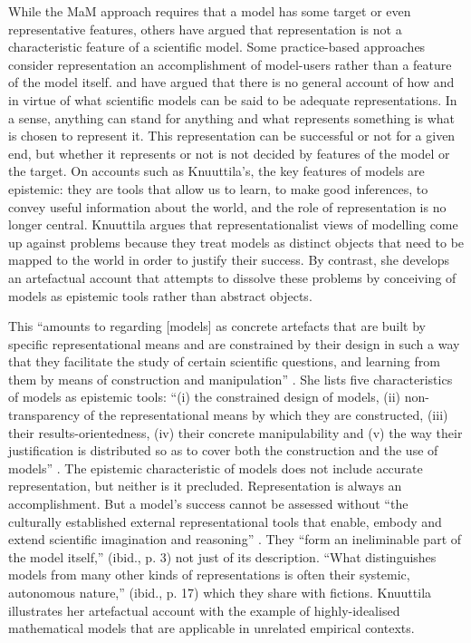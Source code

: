 While the MaM approach requires that a model has some target or even representative features, others have argued  
that representation is not a characteristic feature of a scientific model.
Some practice-based approaches consider representation an accomplishment of model-users rather than a feature of the model itself.
\citet{knuuttila2011,Knuuttila2017} and \citet{teller01} have argued that there is no general account of how and in virtue of what scientific models can be said to be adequate representations. 
In a sense, anything can stand for anything and what represents something is what is chosen to represent it.
This representation can be successful or not for a given end, but whether it represents or not is not decided by features of the model or the target.
On accounts such as Knuuttila's, the key features of models are epistemic: they are tools that allow us to learn, to make good inferences, to convey useful information about the world, and the role of representation is no longer central.
Knuuttila argues that representationalist views of modelling come up against problems because they treat models as distinct objects that need to be mapped to the world in order to justify their success. 
By contrast, she develops an artefactual account that attempts to dissolve these problems by conceiving of models as epistemic tools rather than abstract objects.

This ``amounts to regarding [models] as concrete artefacts that are built by specific representational means and are constrained by their design in such a way that they facilitate the study of certain scientific questions, and learning from them by means of construction and manipulation'' \citep[p.~262]{knuuttila2011}.
She lists five characteristics of models as epistemic tools:
``(i) the constrained design of models, (ii) non-transparency of the representational means by which they are constructed, (iii) their results-orientedness, (iv) their concrete manipulability and (v) the way their justification is distributed so as to cover both the construction and the use of models'' \citep[p.~267]{knuuttila2011}.
The epistemic characteristic of models does not include accurate representation, but neither is it precluded.
Representation is always an accomplishment. 
But a model's success cannot be assessed without ``the culturally established external representational tools that enable, embody and extend scientific imagination and reasoning'' \citep[p.~1]{Knuuttila2017}. 
They ``form an ineliminable part of the model itself,'' (ibid., p. 3) not just of its description. 
``What distinguishes models from many other kinds of representations is often their systemic, autonomous nature,'' (ibid., p. 17) which they share with fictions.
Knuuttila illustrates her artefactual account with the example of highly-idealised mathematical models that are applicable in unrelated empirical contexts. 


